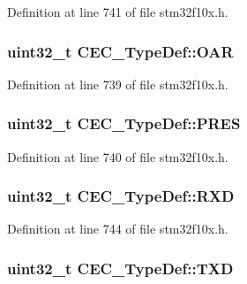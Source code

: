 Definition at line 741 of file stm32f10x.\+h.

\subsubsection[{\texorpdfstring{O\+AR}{OAR}}]{ {\bf uint32\+\_\+t} C\+E\+C\+\_\+\+Type\+Def\+::\+O\+AR}\hypertarget{struct_c_e_c___type_def_aa578935e8a0795a0a7494f4d281bc43d}{}\label{struct_c_e_c___type_def_aa578935e8a0795a0a7494f4d281bc43d}


Definition at line 739 of file stm32f10x.\+h.

\subsubsection[{\texorpdfstring{P\+R\+ES}{PRES}}]{ {\bf uint32\+\_\+t} C\+E\+C\+\_\+\+Type\+Def\+::\+P\+R\+ES}\hypertarget{struct_c_e_c___type_def_a2e1d5865f3d49a195e58f265b425256e}{}\label{struct_c_e_c___type_def_a2e1d5865f3d49a195e58f265b425256e}


Definition at line 740 of file stm32f10x.\+h.

\subsubsection[{\texorpdfstring{R\+XD}{RXD}}]{ {\bf uint32\+\_\+t} C\+E\+C\+\_\+\+Type\+Def\+::\+R\+XD}\hypertarget{struct_c_e_c___type_def_a13d5b0e5228d5cca9f7c5d8533705d21}{}\label{struct_c_e_c___type_def_a13d5b0e5228d5cca9f7c5d8533705d21}


Definition at line 744 of file stm32f10x.\+h.

\subsubsection[{\texorpdfstring{T\+XD}{TXD}}]{ {\bf uint32\+\_\+t} C\+E\+C\+\_\+\+Type\+Def\+::\+T\+XD}\hypertarget{struct_c_e_c___type_def_a462a952588fc45732d4545dbe79356da}{}\label{struct_c_e_c___type_def_a462a952588fc45732d4545dbe79356da}


